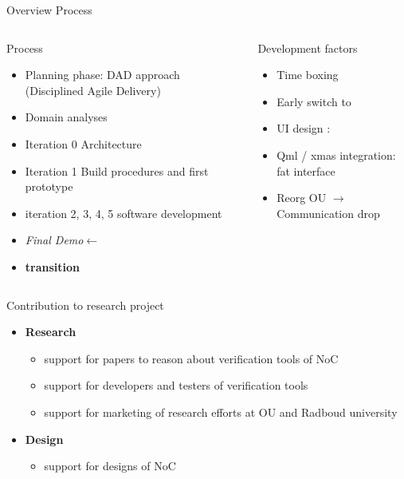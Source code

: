 \documentclass[11pt]{beamer}
\begin{document}
\begin{frame}{Overview Process}
	\begin{columns}
		\begin{column}[t]{5cm}
			Process
			\begin{itemize}
				\item <1->Planning phase: DAD approach (Disciplined Agile Delivery)
				\item <1->Domain analyses
				\item <1->Iteration 0 Architecture
				\item <1->Iteration 1 Build procedures and first prototype
				\item <1->iteration 2, 3, 4, 5 software development
				\item <1->\textit{Final Demo}$\leftarrow$
				\item <1->\textbf{transition}
			\end{itemize}
		\end{column}
		\begin{column}[t]{5cm}
			Development factors
			\begin{itemize}
				\item <2->Time boxing
				\item <2->Early switch to \qt
				\item <2->UI design : \qml
				\item <2->Qml / xmas integration: fat interface
				\item <2->Reorg OU $\rightarrow$ Communication drop
			\end{itemize}
		\end{column}
	\end{columns}
\end{frame}

\begin{frame}{Contribution to research project}

	\begin{itemize}
		\item {\bf Research}
		\begin{itemize}
			\item support for papers to reason about verification tools of NoC
			\item support for developers and testers of verification tools
			\item support for marketing of research efforts at OU and Radboud university
		\end{itemize}
		\item {\bf Design}
		\begin{itemize}
			\item support for designs of NoC
		\end{itemize}
	\end{itemize}

\end{frame}
\end{document}
